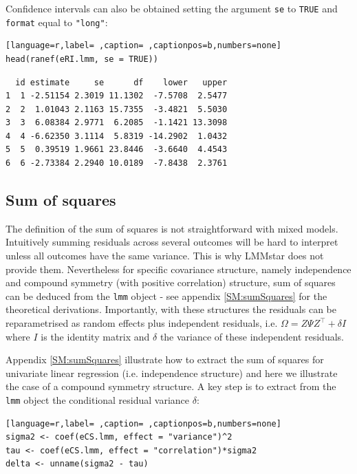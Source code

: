 \documentclass[12pt]{article}
\newcommand\Warning[1][3ex]{%
\renewcommand\stacktype{L}%
\scaleto{\stackon[1.3pt]{\color{red}$\triangle$}{\tiny\bfseries !}}{#1}%
\xspace
}
\newcommand\trans[1]{{#1}^\intercal}%
\begin{document}
Confidence intervals can also be obtained setting the argument \texttt{se} to
\texttt{TRUE} and \texttt{format} equal to \texttt{"long"}:
\begin{lstlisting}[language=r,label= ,caption= ,captionpos=b,numbers=none]
head(ranef(eRI.lmm, se = TRUE))
\end{lstlisting}

\begin{verbatim}
  id estimate     se      df    lower   upper
1  1 -2.51154 2.3019 11.1302  -7.5708  2.5477
2  2  1.01043 2.1163 15.7355  -3.4821  5.5030
3  3  6.08384 2.9771  6.2085  -1.1421 13.3098
4  4 -6.62350 3.1114  5.8319 -14.2902  1.0432
5  5  0.39519 1.9661 23.8446  -3.6640  4.4543
6  6 -2.73384 2.2940 10.0189  -7.8438  2.3761
\end{verbatim}


\clearpage

\subsection{Sum of squares}
\label{sec:org6b15592}

\Warning The definition of the sum of squares is not straightforward with mixed
models. Intuitively summing residuals across several outcomes will be
hard to interpret unless all outcomes have the same variance. This is
why LMMstar does not provide them. Nevertheless for specific
covariance structure, namely independence and compound symmetry (with
positive correlation) structure, sum of squares can be deduced from
the \texttt{lmm} object - see appendix \ref{SM:sumSquares} for the theoretical
derivations. Importantly, with these structures the residuals can be
reparametrised as random effects plus independent residuals,
i.e. \(\Omega = Z \Psi \trans{Z} + \delta I\) where \(I\) is the
identity matrix and \(\delta\) the variance of these independent
residuals.

\bigskip

Appendix \ref{SM:sumSquares} illustrate how to extract the sum of squares
for univariate linear regression (i.e. independence structure) and
here we illustrate the case of a compound symmetry structure.  A key
step is to extract from the \texttt{lmm} object the conditional residual variance
\(\delta\):
\begin{lstlisting}[language=r,label= ,caption= ,captionpos=b,numbers=none]
sigma2 <- coef(eCS.lmm, effect = "variance")^2
tau <- coef(eCS.lmm, effect = "correlation")*sigma2
delta <- unname(sigma2 - tau)
\end{lstlisting}
\end{document}
